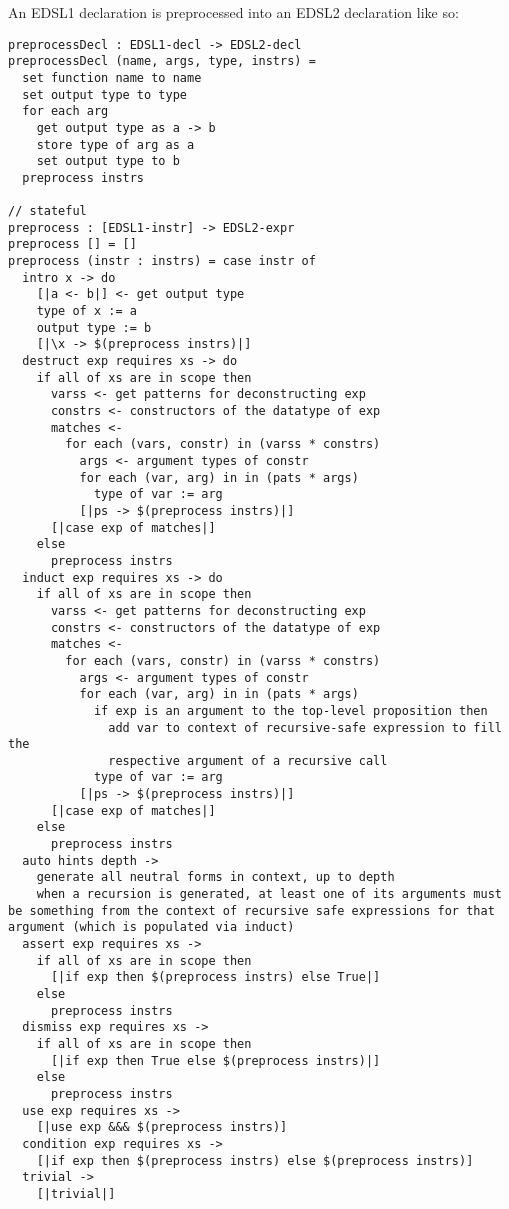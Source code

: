 An EDSL1 declaration is preprocessed into an EDSL2 declaration like so:

\begin{verbatim}
preprocessDecl : EDSL1-decl -> EDSL2-decl
preprocessDecl (name, args, type, instrs) =
  set function name to name
  set output type to type
  for each arg
    get output type as a -> b 
    store type of arg as a
    set output type to b
  preprocess instrs

// stateful
preprocess : [EDSL1-instr] -> EDSL2-expr
preprocess [] = []
preprocess (instr : instrs) = case instr of 
  intro x -> do
    [|a <- b|] <- get output type
    type of x := a
    output type := b
    [|\x -> $(preprocess instrs)|]
  destruct exp requires xs -> do
    if all of xs are in scope then 
      varss <- get patterns for deconstructing exp
      constrs <- constructors of the datatype of exp
      matches <- 
        for each (vars, constr) in (varss * constrs)
          args <- argument types of constr
          for each (var, arg) in in (pats * args)
            type of var := arg
          [|ps -> $(preprocess instrs)|]
      [|case exp of matches|]
    else
      preprocess instrs
  induct exp requires xs -> do
    if all of xs are in scope then 
      varss <- get patterns for deconstructing exp
      constrs <- constructors of the datatype of exp
      matches <-
        for each (vars, constr) in (varss * constrs)
          args <- argument types of constr
          for each (var, arg) in in (pats * args)
            if exp is an argument to the top-level proposition then
              add var to context of recursive-safe expression to fill the
              respective argument of a recursive call
            type of var := arg
          [|ps -> $(preprocess instrs)|]
      [|case exp of matches|]
    else
      preprocess instrs
  auto hints depth ->
    generate all neutral forms in context, up to depth
    when a recursion is generated, at least one of its arguments must be something from the context of recursive safe expressions for that argument (which is populated via induct)
  assert exp requires xs ->
    if all of xs are in scope then
      [|if exp then $(preprocess instrs) else True|]
    else
      preprocess instrs
  dismiss exp requires xs ->
    if all of xs are in scope then
      [|if exp then True else $(preprocess instrs)|]
    else
      preprocess instrs
  use exp requires xs -> 
    [|use exp &&& $(preprocess instrs)]
  condition exp requires xs ->
    [|if exp then $(preprocess instrs) else $(preprocess instrs)]
  trivial ->
    [|trivial|]


\end{verbatim}


